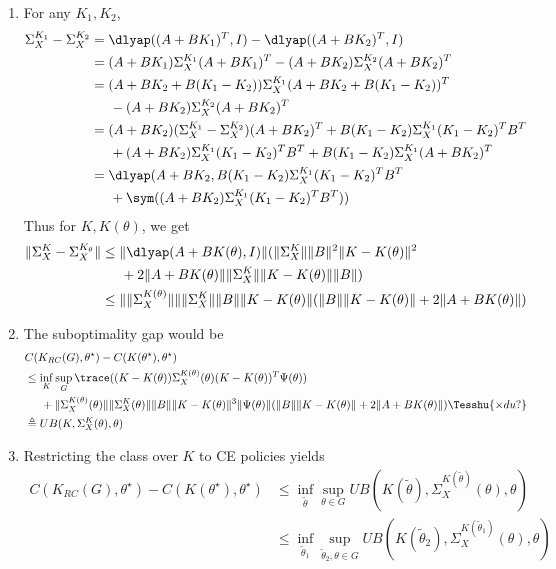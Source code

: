 \begin{enumerate}
\item For any $K_1, K_2$, 
\begin{align*}
    \Sigma_X^{K_1} - \Sigma_X^{K_2} &= \dlyap((A+BK_1)^T, I) - \dlyap((A+BK_2)^T, I) \\
    &= (A+BK_1)\Sigma_X^{K_1}(A+BK_1)^T - (A+BK_2)\Sigma_X^{K_2}(A+BK_2)^T \\
    &= (A+BK_2+B(K_1-K_2))\Sigma_X^{K_1}(A+BK_2+B(K_1-K_2))^T \\
    & \hspace{5mm}- (A+BK_2)\Sigma_X^{K_2}(A+BK_2)^T \\
    &= (A+BK_2)(\Sigma_X^{K_1}-\Sigma_X^{K_2})(A+BK_2)^T + B(K_1-K_2)\Sigma_X^{K_1}(K_1-K_2)^TB^T\\
    &\hspace{5mm}+ (A+BK_2)\Sigma_X^{K_1}(K_1-K_2)^TB^T + B(K_1-K_2)\Sigma_X^{K_1}(A+BK_2)^T \\
    &= \dlyap(A+BK_2, B(K_1-K_2)\Sigma_X^{K_1}(K_1-K_2)^TB^T \\
    &\hspace{5mm}+ \sym((A+BK_2)\Sigma_X^{K_1}(K_1-K_2)^TB^T))
\end{align*}
Thus for $K, K(\theta)$, we get
\begin{align*}
    \|\Sigma_X^{K} - \Sigma_X^{K_\theta}\| 
    &\leq \|\dlyap(A+BK(\theta), I)\|(\|\Sigma_X^{K}\|\|B\|^2\|K-K(\theta)\|^2 \\
    &\hspace{5mm}+ 2\|A+BK(\theta)\|\|\Sigma_X^{K}\|\|K-K(\theta)\|\|B\|) \\
    &\leq \|\|\Sigma_X^{K(\theta)}\|\|\|\Sigma_X^{K}\|\|B\|\|K-K(\theta)\|(\|B\|\|K-K(\theta)\| + 2\|A+BK(\theta)\|)
\end{align*}

\item The suboptimality gap would be
\begin{align*}
    &C(K_{RC}(G), \theta^\star) - C(K(\theta^\star), \theta^\star) \\
    &\leq \inf_K\sup_G \trace ((K-K(\theta))\Sigma_X^{K(\theta)}(\theta)(K-K(\theta))^T\Psi(\theta)) \\
    &\hspace{5mm}+ \|\Sigma_X^{K(\theta)}(\theta)\|\|\Sigma_X^{K}(\theta)\|\|B\|\|K-K(\theta)\|^3\|\Psi(\theta)\|(\|B\|\|K-K(\theta)\| + 2\|A+BK(\theta)\|)\Tesshu{\times du?} \\
    &\triangleq UB(K, \Sigma_X^K(\theta), \theta)
\end{align*}

\item Restricting the class over $K$ to CE policies yields
\begin{align*}
    C(K_{RC}(G), \theta^\star) - C(K(\theta^\star), \theta^\star) &\leq \inf_{\tilde\theta}\sup_{\theta\in G} UB(K(\tilde\theta), \Sigma_X^{K(\tilde\theta)}(\theta), \theta) \\
    &\leq \inf_{\tilde\theta_1}\sup_{\tilde\theta_2, \theta\in G}UB(K(\tilde\theta_2), \Sigma_X^{K(\tilde\theta_1)}(\theta), \theta)
\end{align*}


\end{enumerate}
